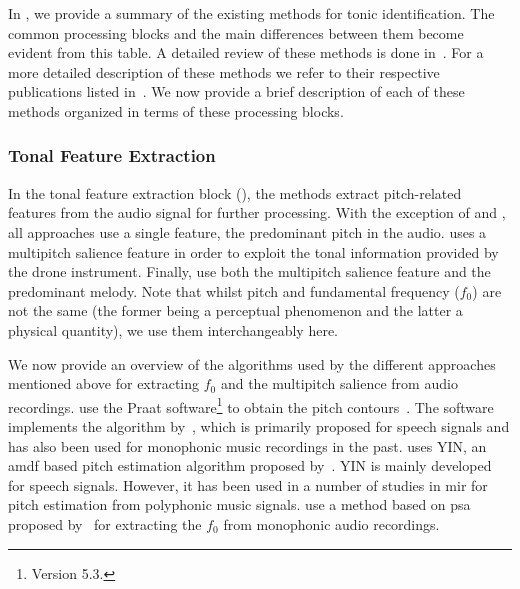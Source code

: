 In , we provide a summary of the existing methods for tonic identification. The common processing blocks and the main differences between them become evident from this table. A detailed review of these methods is done in~\cite{Gulati2014Tonic}. For a more detailed description of these methods we refer to their respective publications listed in~. We now provide a brief description of each of these methods organized in terms of these processing blocks.


\subsubsection{Tonal Feature Extraction}
\label{Feature Extraction}

In the tonal feature extraction block (), the methods extract pitch-related
features from the audio signal for further processing. With the exception of \cite{salamon2012multipitch} and \cite{gulati2012two}, all approaches use a single feature, the predominant pitch in the audio. \cite{salamon2012multipitch} uses a multipitch salience feature in order to exploit the tonal information provided by the drone instrument. Finally, \cite{gulati2012two} use both the multipitch salience feature and the predominant melody. Note that whilst pitch and fundamental frequency ($f_0$) are not the same (the former being a perceptual phenomenon and the latter a physical quantity), we use them interchangeably here.

We now provide an overview of the algorithms used by the different approaches mentioned above for extracting $f_0$ and the multipitch salience from audio recordings. \cite{ranjani2011carnatic} use the Praat software\footnote{Version 5.3.} to obtain the pitch contours~\citep{BoersmaPaul2001}. The software implements the algorithm by~\cite{boersma1993accurate}, which is primarily proposed for speech signals and has also been used for monophonic music recordings in the past. \cite{bellur2012knowledge} uses YIN, an \gls{amdf} based pitch estimation algorithm proposed by~\cite{DeCheveigne2002}. YIN is mainly developed for speech signals. However, it has been used in a number of studies in \gls{mir} for pitch estimation from polyphonic music signals. \cite{Sengupta2005b} use a method based on \gls{psa} proposed by~\cite{AKDatta_1996} for extracting the $f_0$ from monophonic audio recordings. %


